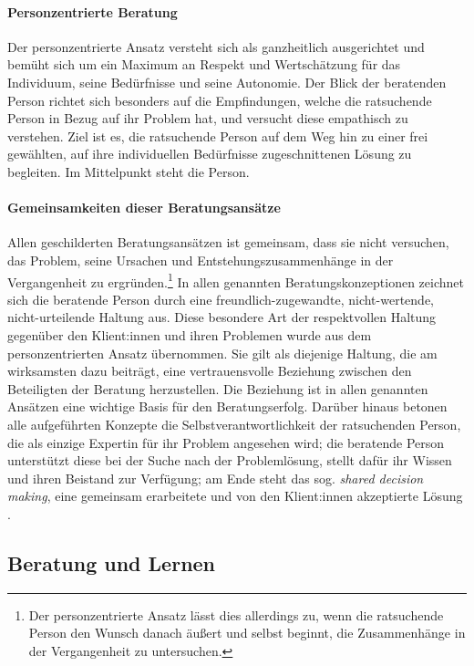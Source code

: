 \documentclass[
  twoside,
  parskip=half-,
]{scrreprt}
\begin{document}
\paragraph{Personzentrierte Beratung}
Der personzentrierte Ansatz versteht sich als ganzheitlich ausgerichtet und bemüht sich um ein Maximum an Respekt und Wertschätzung für das Individuum, seine Bedürfnisse und seine Autonomie. Der Blick der beratenden Person richtet sich besonders auf die Empfindungen, welche die ratsuchende Person in Bezug auf ihr Problem hat, und versucht diese empathisch zu verstehen. Ziel ist es, die ratsuchende Person auf dem Weg hin zu einer frei gewählten, auf ihre individuellen Bedürfnisse zugeschnittenen Lösung zu begleiten. Im Mittelpunkt steht die Person.

\paragraph{Gemeinsamkeiten dieser Beratungsansätze}

Allen geschilderten Beratungsansätzen ist gemeinsam, dass sie nicht versuchen, das Problem, seine Ursachen und Entstehungszusammenhänge in der Vergangenheit zu ergründen.\footnote{Der personzentrierte Ansatz lässt dies allerdings zu, wenn die ratsuchende Person den Wunsch danach äußert und selbst beginnt, die Zusammenhänge in der Vergangenheit zu untersuchen.} 
In allen genannten Beratungskonzeptionen zeichnet sich die beratende Person durch eine freundlich-zugewandte, nicht-wertende, nicht-urteilende Haltung aus. Diese besondere Art der respektvollen Haltung gegenüber den Klient:innen und ihren Problemen wurde aus dem personzentrierten Ansatz übernommen. Sie gilt als diejenige Haltung, die am wirksamsten dazu beiträgt, eine vertrauensvolle Beziehung zwischen den Beteiligten der Beratung herzustellen. Die Beziehung ist in allen genannten Ansätzen eine wichtige Basis für den Beratungserfolg. Darüber hinaus betonen alle aufgeführten Konzepte die Selbstverantwortlichkeit der ratsuchenden Person, die als einzige Expertin für ihr Problem angesehen wird; die beratende Person unterstützt diese bei der Suche nach der Problemlösung, stellt dafür ihr Wissen und ihren Beistand zur Verfügung; am Ende steht das sog. \textit{shared decision making}, eine gemeinsam erarbeitete und von den Klient:innen akzeptierte Lösung \autocite[127]{hacker2021}.

\subsection{Beratung und Lernen}
\end{document}
